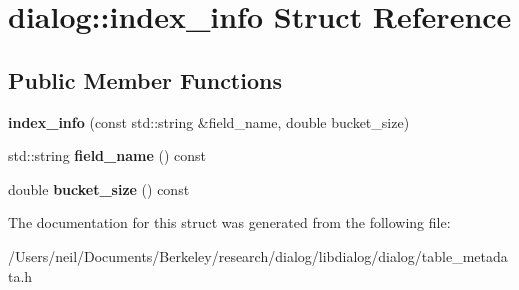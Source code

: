 \hypertarget{structdialog_1_1index__info}{}\section{dialog\+:\+:index\+\_\+info Struct Reference}
\label{structdialog_1_1index__info}
\subsection*{Public Member Functions}
\begin{DoxyCompactItemize}
\item 
\mbox{\label{structdialog_1_1index__info_ac65aecab3074cdf5b42121b3e75b71f2}} 
{\bfseries index\+\_\+info} (const std\+::string \&field\+\_\+name, double bucket\+\_\+size)
\item 
\mbox{\label{structdialog_1_1index__info_a8a35640303dd8143bd5465368ca5311a}} 
std\+::string {\bfseries field\+\_\+name} () const
\item 
\mbox{\label{structdialog_1_1index__info_adc3c71509a3b0b007edbd9a73500c337}} 
double {\bfseries bucket\+\_\+size} () const
\end{DoxyCompactItemize}


The documentation for this struct was generated from the following file\+:\begin{DoxyCompactItemize}
\item 
/\+Users/neil/\+Documents/\+Berkeley/research/dialog/libdialog/dialog/table\+\_\+metadata.\+h\end{DoxyCompactItemize}
